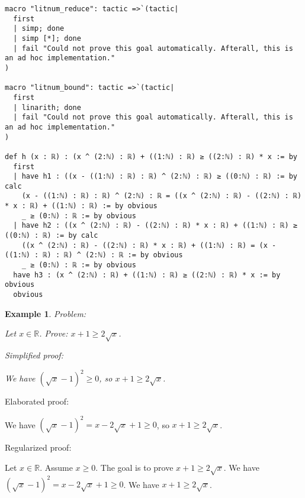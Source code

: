 \documentclass{article}
\newtheorem{example}{Example}
\begin{document}
\begin{tcolorbox}[colback=white!10, width=\linewidth]
\begin{lstlisting}[language=Lean4]
macro "litnum_reduce": tactic =>`(tactic|
  first
  | simp; done
  | simp [*]; done
  | fail "Could not prove this goal automatically. Afterall, this is an ad hoc implementation."
)

macro "litnum_bound": tactic =>`(tactic|
  first
  | linarith; done
  | fail "Could not prove this goal automatically. Afterall, this is an ad hoc implementation."
)

def h (x : ℝ) : (x ^ (2:ℕ) : ℝ) + ((1:ℕ) : ℝ) ≥ ((2:ℕ) : ℝ) * x := by
  first
  | have h1 : ((x - ((1:ℕ) : ℝ) : ℝ) ^ (2:ℕ) : ℝ) ≥ ((0:ℕ) : ℝ) := by calc
    (x - ((1:ℕ) : ℝ) : ℝ) ^ (2:ℕ) : ℝ = ((x ^ (2:ℕ) : ℝ) - ((2:ℕ) : ℝ) * x : ℝ) + ((1:ℕ) : ℝ) := by obvious
    _ ≥ (0:ℕ) : ℝ := by obvious
  | have h2 : ((x ^ (2:ℕ) : ℝ) - ((2:ℕ) : ℝ) * x : ℝ) + ((1:ℕ) : ℝ) ≥ ((0:ℕ) : ℝ) := by calc
    ((x ^ (2:ℕ) : ℝ) - ((2:ℕ) : ℝ) * x : ℝ) + ((1:ℕ) : ℝ) = (x - ((1:ℕ) : ℝ) : ℝ) ^ (2:ℕ) : ℝ := by obvious
    _ ≥ (0:ℕ) : ℝ := by obvious
  have h3 : (x ^ (2:ℕ) : ℝ) + ((1:ℕ) : ℝ) ≥ ((2:ℕ) : ℝ) * x := by obvious
  obvious

\end{lstlisting}
\end{tcolorbox}


\begin{example}
Problem:
\begin{tcolorbox}[colback=yellow!10, width=\linewidth]
Let $x\in\mathbb{R}$. Prove: $x + 1 \ge 2\sqrt{x}$.
\end{tcolorbox}

Simplified proof:
\begin{tcolorbox}[colback=blue!10, width=\linewidth]
We have $(\sqrt{x}-1)^2 \ge 0$, so $x+1 \ge 2\sqrt{x}$.
\end{tcolorbox}
\end{example}

Elaborated proof:
\begin{tcolorbox}[colback=green!10, width=\linewidth]
We have $(\sqrt{x}-1)^2 = x - 2\sqrt{x} + 1 \ge 0$, so $x+1 \ge 2\sqrt{x}$.
\end{tcolorbox}

Regularized proof:
\begin{tcolorbox}[colback=red!10, width=\linewidth]
Let $x\in\mathbb{R}$.
Assume $x\ge 0$.
The goal is to prove $x+1 \ge 2\sqrt{x}$.
We have ${(\sqrt{x}-1)}^2 = x - 2\sqrt{x} + 1 \ge 0$.
We have $x+1 \ge 2\sqrt{x}$.
\end{tcolorbox}
\end{document}
